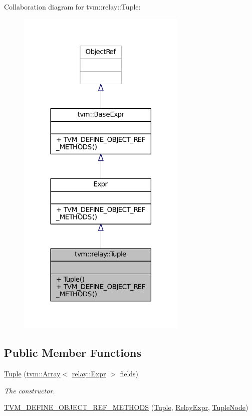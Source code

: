 Collaboration diagram for tvm\+:\+:relay\+:\+:Tuple\+:
\nopagebreak
\begin{figure}[H]
\begin{center}
\leavevmode
\includegraphics[width=230pt]{classtvm_1_1relay_1_1Tuple__coll__graph}
\end{center}
\end{figure}
\subsection*{Public Member Functions}
\begin{DoxyCompactItemize}
\item 
\hyperlink{classtvm_1_1relay_1_1Tuple_a5e13aeb7c3d80880a076566138268f9b}{Tuple} (\hyperlink{classtvm_1_1Array}{tvm\+::\+Array}$<$ \hyperlink{namespacetvm_1_1relay_a5b84e3790f89bb3fad5c7911eeb99531}{relay\+::\+Expr} $>$ fields)
\begin{DoxyCompactList}\small\item\em The constructor. \end{DoxyCompactList}\item 
\hyperlink{classtvm_1_1relay_1_1Tuple_ac2143d959386633769c0befeb50d69cc}{T\+V\+M\+\_\+\+D\+E\+F\+I\+N\+E\+\_\+\+O\+B\+J\+E\+C\+T\+\_\+\+R\+E\+F\+\_\+\+M\+E\+T\+H\+O\+DS} (\hyperlink{classtvm_1_1relay_1_1Tuple}{Tuple}, \hyperlink{classtvm_1_1RelayExpr}{Relay\+Expr}, \hyperlink{classtvm_1_1relay_1_1TupleNode}{Tuple\+Node})
\end{DoxyCompactItemize}


